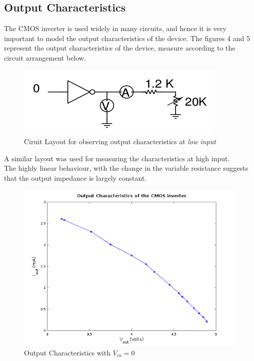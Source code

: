 \documentclass[a4paper, 11pt]{article}
\begin{document}
\subsection{Output Characteristics}
The CMOS inverter is used widely in many circuits, and hence it is very important to model the output characteristics of the device. The figures 4 and 5 represent the output characteristics of the device, measure according to the circuit arrangement below.
\begin{figure}[H]
\centering
\includegraphics[scale=0.7]{fig2}
\caption{Ciruit Layout for observing output characteristics at {\em low input}}
\end{figure}
\noindent A similar layout was used for measuring the characteristics at high input.\\
The highly linear behaviour, with the change in the variable resistance suggests that the output impedance is largely constant.
\newpage
\begin{figure}[H]
\centering
\includegraphics[scale=0.6]{Output_0}
\caption{Output Characteristics with $V_{in} = 0$}
\end{figure}
\end{document}
